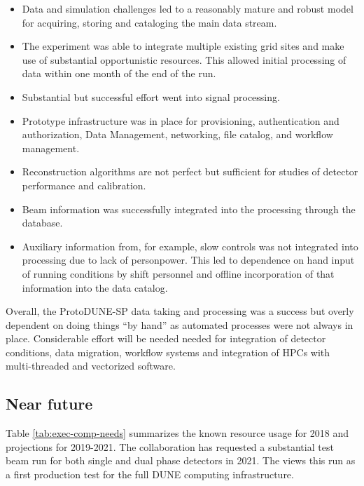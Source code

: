 \begin{itemize}
    \item Data and simulation challenges led to a reasonably mature and robust model for acquiring, storing and cataloging the main data stream. 
    \item The experiment was able to integrate multiple existing grid sites and make use of substantial opportunistic resources.  This allowed initial processing of data within one month of the end of the run.
    \item Substantial but successful effort went into signal processing. 
    \item Prototype infrastructure was in place for provisioning, authentication and authorization, Data Management, networking, file catalog, and workflow management. 
    \item Reconstruction algorithms are not perfect but sufficient for studies of detector performance and calibration. 
    \item Beam information was successfully integrated into the processing through the  database.
    \item Auxiliary information from, for example, slow controls was not integrated into processing due to lack of personpower.  This led to dependence on hand input of running conditions by shift personnel and offline incorporation of that information into the data catalog. 
\end{itemize}

Overall, the ProtoDUNE-SP data taking and processing was a success but overly dependent on doing things ``by hand'' as automated processes were not always in place. Considerable effort will be needed needed for integration of detector conditions, data migration, workflow systems and integration of HPCs with multi-threaded and vectorized software.

\subsection{Near future}

Table \ref{tab:exec-comp-needs} summarizes the known resource usage for 2018 and projections for 2019-2021.  The collaboration has requested a substantial test beam run for both single and dual phase detectors in 2021.  The  views this run as a first production test for the full DUNE computing infrastructure. 





